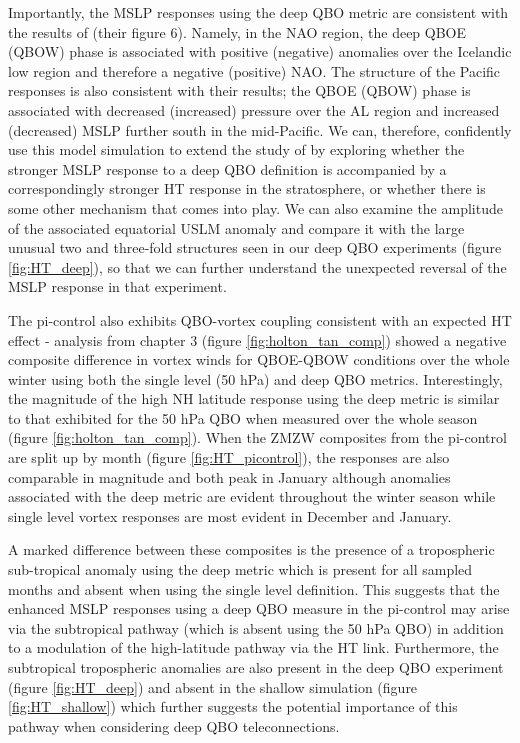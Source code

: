 Importantly, the MSLP responses using the deep QBO metric are consistent with the results of \cite{andrewsObserved2019d} (their figure 6). Namely, in the NAO region, the deep QBOE (QBOW) phase is associated with positive (negative) anomalies over the Icelandic low region and therefore a negative (positive) NAO. The structure of the Pacific responses is also consistent with their results; the QBOE (QBOW) phase is associated with decreased (increased) pressure over the AL region and increased (decreased) MSLP further south in the mid-Pacific. We can, therefore, confidently use this model simulation to extend the study of \cite{andrewsObserved2019d} by exploring whether the stronger MSLP response to a deep QBO definition is accompanied by a correspondingly stronger HT response in the stratosphere, or whether there is some other mechanism that comes into play. We can also examine the amplitude of the associated equatorial USLM anomaly and compare it with the large unusual two and three-fold structures seen in our deep QBO experiments (figure \ref{fig:HT_deep}), so that we can further understand the unexpected reversal of the MSLP response in that experiment.    

The pi-control also exhibits QBO-vortex coupling consistent with an expected HT effect - analysis from chapter 3 (figure \ref{fig:holton_tan_comp}) showed a negative composite difference in vortex winds for QBOE-QBOW conditions over the whole winter using both the single level (50 hPa) and deep QBO metrics. Interestingly, the magnitude of the high NH latitude response using the deep metric is similar to that exhibited for the 50 hPa QBO when measured over the whole season (figure \ref{fig:holton_tan_comp}). When the ZMZW composites from the pi-control are split up by month (figure \ref{fig:HT_picontrol}), the responses are also comparable in magnitude and both peak in January although anomalies associated with the deep metric are evident throughout the winter season while single level vortex responses are most evident in December and January.

A marked difference between these composites is the presence of a tropospheric sub-tropical anomaly using the deep metric which is present for all sampled months and absent when using the single level definition. This suggests that the enhanced MSLP responses using a deep QBO measure in the pi-control may arise via the subtropical pathway (which is absent using the 50 hPa QBO) in addition to a modulation of the high-latitude pathway via the HT link. Furthermore, the subtropical tropospheric anomalies are also present in the deep QBO experiment (figure \ref{fig:HT_deep}) and absent in the shallow simulation (figure \ref{fig:HT_shallow}) which further suggests the potential importance of this pathway when considering deep QBO teleconnections.

